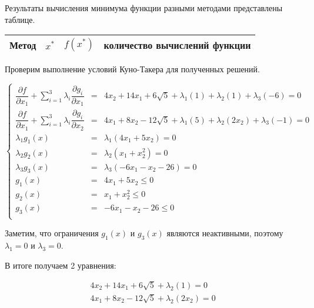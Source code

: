\documentclass[12pt,a4paper,oneside]{report}
\begin{document}
Результаты вычисления минимума функции разными методами представлены  таблице.
\begin{center}
\begin{tabular}{||c|c|c|c||}
\hline
Метод		&	$x^{*}$	&	$f(x^{*})$  &	количество вычислений функции \\
\hline
 
\hline
 
\hline
\end{tabular}
\end{center}

Проверим выполнение условий Куно-Такера для полученных решений.

\begin{equation}
\left\{  
 	\begin{array}{rcl}  
           \dfrac{\partial{f}}{\partial{x_{1}}} + \sum\limits_{i=1}^3\lambda_{i}\dfrac{\partial{g_{i}}}{\partial{x_{1}}} & = & 4x_{2} + 14x_{1} + 6\sqrt{5} + \lambda_{1}(1) + \lambda_{2}(1) + \lambda_{3}(-6)  = 0\\  
           \dfrac{\partial{f}}{\partial{x_{1}}} +  \sum\limits_{i=1}^3\lambda_{i}\dfrac{\partial{g_{i}}}{\partial{x_{2}}} & = &4x_{1} + 8x_{2} - 12\sqrt{5} + \lambda_{1}(5) + \lambda_{2}(2x_{2}) + \lambda_{3}(-1)  = 0\\
	\lambda_{1}g_{1}(x) & = & \lambda_{1}(4x_{1} + 5x_{2})  =  0 \\  
	\lambda_{2}g_{2}(x) & = & \lambda_{2}(x_{1} + x^{2}_{2})  =  0 \\  
	\lambda_{3}g_{3}(x) & = & \lambda_{3}(-6x_{1} - x_{2} - 26)  =  0 \\  
	g_{1}(x) & = & 4x_{1} + 5x_{2}  \leq  0 \\  
           g_{2}(x) & = & x_{1} + x^{2}_{2}  \leq  0 \\  
           g_{3}(x) & = & -6x_{1} - x_{2} - 26 \leq  0 \\  
           \end{array}   
\right.
\end{equation}

Заметим, что ограничения $g_{1}(x)$ и $g_{3}(x)$ являются неактивными, поэтому $\lambda_{1} = 0$ и
$\lambda_{3} = 0$. 

В итоге получаем 2 уравнения:

\begin{equation}
\begin{array}{rcl}  
 4x_{2} + 14x_{1} + 6\sqrt{5} +  \lambda_{2}(1)  = 0\\  
 4x_{1} + 8x_{2} - 12\sqrt{5} +  \lambda_{2}(2x_{2}) = 0\\
\end{array}   
\end{equation}
\end{document}

